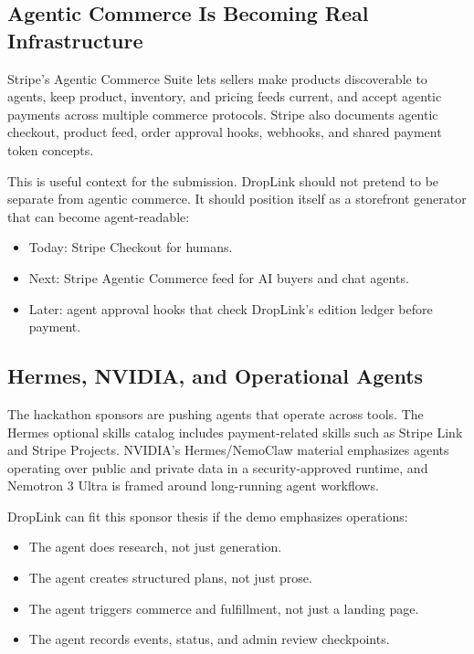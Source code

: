 \documentclass[11pt]{article}
\begin{document}
\subsection{Agentic Commerce Is Becoming Real Infrastructure}

Stripe's Agentic Commerce Suite lets sellers make products discoverable to agents, keep product, inventory, and pricing feeds current, and accept agentic payments across multiple commerce protocols. Stripe also documents agentic checkout, product feed, order approval hooks, webhooks, and shared payment token concepts.

This is useful context for the submission. DropLink should not pretend to be separate from agentic commerce. It should position itself as a storefront generator that can become agent-readable:

\begin{itemize}
  \item Today: Stripe Checkout for humans.
  \item Next: Stripe Agentic Commerce feed for AI buyers and chat agents.
  \item Later: agent approval hooks that check DropLink's edition ledger before payment.
\end{itemize}

\subsection{Hermes, NVIDIA, and Operational Agents}

The hackathon sponsors are pushing agents that operate across tools. The Hermes optional skills catalog includes payment-related skills such as Stripe Link and Stripe Projects. NVIDIA's Hermes/NemoClaw material emphasizes agents operating over public and private data in a security-approved runtime, and Nemotron 3 Ultra is framed around long-running agent workflows.

DropLink can fit this sponsor thesis if the demo emphasizes operations:

\begin{itemize}
  \item The agent does research, not just generation.
  \item The agent creates structured plans, not just prose.
  \item The agent triggers commerce and fulfillment, not just a landing page.
  \item The agent records events, status, and admin review checkpoints.
\end{itemize}
\end{document}
